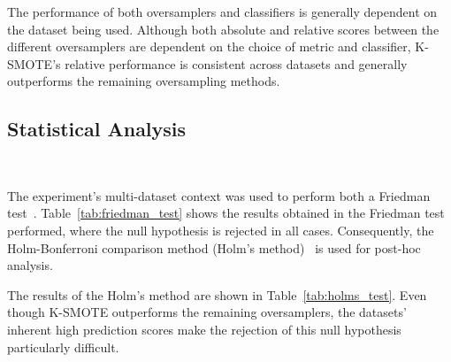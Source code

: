 \documentclass[parskip=full]{scrartcl}
\begin{document}
The performance of both oversamplers and classifiers is generally dependent on the dataset being
used. Although both absolute and relative scores between the different oversamplers are dependent on
the choice of metric and classifier, K-SMOTE's relative performance is consistent across
datasets and generally outperforms the remaining oversampling methods.


\subsection{Statistical Analysis}~\label{sec:statistical_analysis}

The experiment's multi-dataset context was used to perform both a Friedman
test~\cite{friedman1937use}. Table~\ref{tab:friedman_test} shows the results obtained in the
Friedman test performed, where the null hypothesis is rejected in all cases. Consequently, the
Holm-Bonferroni comparison method (Holm's method)~\cite{holm1979simple} is used for post-hoc
analysis.


The results of the Holm's method are shown in Table~\ref{tab:holms_test}. Even though K-SMOTE
outperforms the remaining oversamplers, the datasets' inherent high prediction scores make the
rejection of this null hypothesis particularly difficult.
\end{document}

